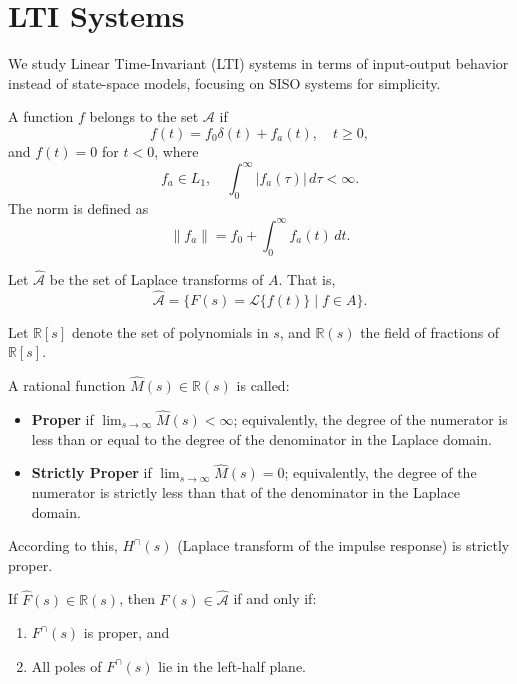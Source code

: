 \section{LTI Systems}

We study Linear Time-Invariant (LTI) systems in terms of input-output behavior instead of state-space models, focusing on SISO systems for simplicity.  

\begin{definition}[Set $A$]  
A function $f$ belongs to the set $\mathcal{A}$ if
\[
f(t) = f_0\delta(t) + f_a(t), \quad t \geq 0,
\]
and $f(t) = 0$ for $t < 0$, where
\[
f_a \in L_1, \quad \int_0^\infty |f_a(\tau)| \, d\tau < \infty.
\]
The norm is defined as
\[
\|f_a\| = f_0 + \int_0^\infty f_a(t)\, dt.
\]
\end{definition}

\begin{definition}  
Let $\hat{\mathcal{A}}$ be the set of Laplace transforms of $A$. That is,
\[
\hat{\mathcal{A}} = \{ F(s) = \mathcal{L}\{f(t)\} \mid f \in A \}.
\]
\end{definition}

\begin{definition}  
Let $\mathbb{R}[s]$ denote the set of polynomials in $s$, and $\mathbb{R}(s)$ the field of fractions of $\mathbb{R}[s]$.  

A rational function $\hat{M}(s) \in \mathbb{R}(s)$ is called:  
\begin{itemize}
    \item \textbf{Proper} if $\displaystyle \lim_{s \to \infty} \hat{M}(s) < \infty$; equivalently, the degree of the numerator is less than or equal to the degree of the denominator in the Laplace domain.
    \item \textbf{Strictly Proper} if $\displaystyle \lim_{s \to \infty} \hat{M}(s) = 0$; equivalently, the degree of the numerator is strictly less than that of the denominator in the Laplace domain.
\end{itemize}
According to this, $H^\cap(s)$ (Laplace transform of the impulse response) is strictly proper.
\end{definition}

\begin{theorem}  
If $\hat{F}(s) \in \mathbb{R}(s)$, then $F(s) \in \hat{\mathcal{A}}$ if and only if:
\begin{enumerate}
    \item $F^\cap(s)$ is proper, and  
    \item All poles of $F^\cap(s)$ lie in the left-half plane.  
\end{enumerate}
\end{theorem}

